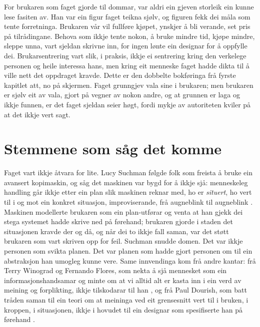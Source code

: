 For brukaren som faget gjorde til dommar, var aldri ein gjeven storleik ein kunne lese fasiten av. Han var ein figur faget teikna sjølv, og figuren fekk dei måla som tente forretninga. Brukaren vår vil fullføre kjøpet, ynskjer å bli verande, set pris på tilrådingane. Behova som ikkje tente nokon, å bruke mindre tid, kjøpe mindre, sleppe unna, vart sjeldan skrivne inn, for ingen lønte ein designar for å oppfylle dei. Brukarsentrering vart slik, i praksis, ikkje ei sentrering kring den verkelege personen og heile interessa hans, men kring eit menneske faget hadde dikta til å ville nett det oppdraget kravde. Dette er den dobbelte bokføringa frå fyrste kapitlet att, no på skjermen. Faget grunngjev vala sine i brukaren; men brukaren er sjølv eit av vala, gjort på vegner av nokon andre, og at grunnen er laga og ikkje funnen, er det faget sjeldan seier høgt, fordi mykje av autoriteten kviler på at det ikkje vert sagt.

\section{Stemmene som såg det komme}

Faget vart ikkje åtvara for lite. Lucy Suchman følgde folk som freista å bruke ein avansert kopimaskin, og såg det maskinen var bygd for å ikkje sjå: menneskeleg handling går ikkje etter ein plan slik maskinen reknar med, ho er \emph{situert}, ho vert til i og mot ein konkret situasjon, improviserande, frå augneblink til augneblink \autocite{suchman1987}. Maskinen modellerte brukaren som ein plan-utførar og venta at han gjekk dei stega systemet hadde skrive ned på førehand; brukaren gjorde i staden det situasjonen kravde der og då, og når dei to ikkje fall saman, var det støtt brukaren som vart skriven opp for feil. Suchman snudde domen. Det var ikkje personen som svikta planen. Det var planen som hadde gjort personen om til ein abstraksjon han umogleg kunne vere. Same innvendinga kom frå andre kantar: frå Terry Winograd og Fernando Flores, som nekta å sjå mennesket som ein informasjonshandsamar og minte om at vi alltid alt er kasta inn i ein verd av meining og forplikting, ikkje tilskodarar til han \autocite{winograd1986}, og frå Paul Dourish, som batt tråden saman til ein teori om at meininga ved eit grensesnitt vert til i bruken, i kroppen, i situasjonen, ikkje i hovudet til ein designar som spesifiserte han på førehand \autocite{dourish2001}.

